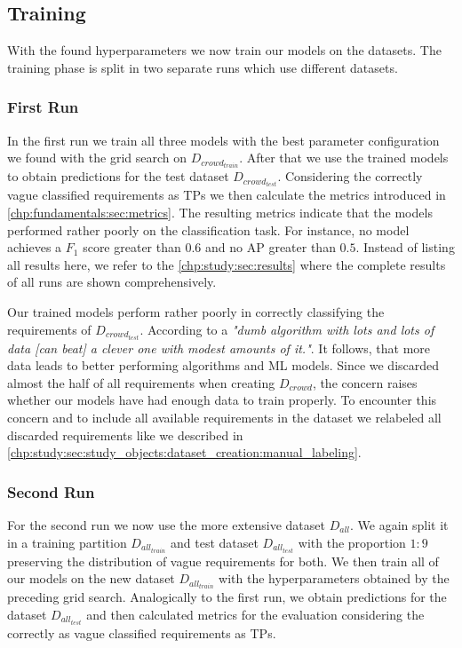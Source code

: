 \subsection{Training}
\label{chp:study:sec:execution:subsec:training}
With the found hyperparameters we now train our models on the datasets.
The training phase is split in two separate runs which use different datasets.

\subsubsection{First Run}
\label{chp:study:sec:execution:subsec:training:first_run}
In the first run we train all three models with the best parameter configuration we found with the grid search on $D_{crowd_{train}}$.
After that we use the trained models to obtain predictions for the test dataset $D_{crowd_{test}}$.
Considering the correctly vague classified requirements as \acp{TP} we then calculate the metrics introduced in \cref{chp:fundamentals:sec:metrics}.
The resulting metrics indicate that the models performed rather poorly on the classification task.
For instance, no model achieves a $F_1$ score greater than $0.6$ and no \ac{AP} greater than $0.5$. %
Instead of listing all results here, we refer to the \cref{chp:study:sec:results} where the complete results of all runs are shown comprehensively.

Our trained models perform rather poorly in correctly classifying the requirements of $D_{crowd_{test}}$.
According to \textcite{Domingos:2012} a \textit{"dumb algorithm with lots and lots of data [can beat] a clever one with modest amounts of it."}.
It follows, that more data leads to better performing algorithms and \ac{ML} models.
Since we discarded almost the half of all requirements when creating $D_{crowd}$, the concern raises whether our models have had enough data to train properly.
To encounter this concern and to include all available requirements in the dataset we relabeled all discarded requirements like we described in \cref{chp:study:sec:study_objects:dataset_creation:manual_labeling}.

\subsubsection{Second Run}
\label{chp:study:sec:execution:subsec:training:second_run}

For the second run we now use the more extensive dataset $D_{all}$.
We again split it in a training partition $D_{all_{train}}$ and test dataset $D_{all_{test}}$ with the proportion $1\mathrm{:}9$ preserving the distribution of vague requirements for both.
We then train all of our models on the new dataset $D_{all_{train}}$ with the hyperparameters obtained by the preceding grid search.
Analogically to the first run, we obtain predictions for the dataset $D_{all_{test}}$ and then calculated metrics for the evaluation considering the correctly as vague classified requirements as \acp{TP}.
